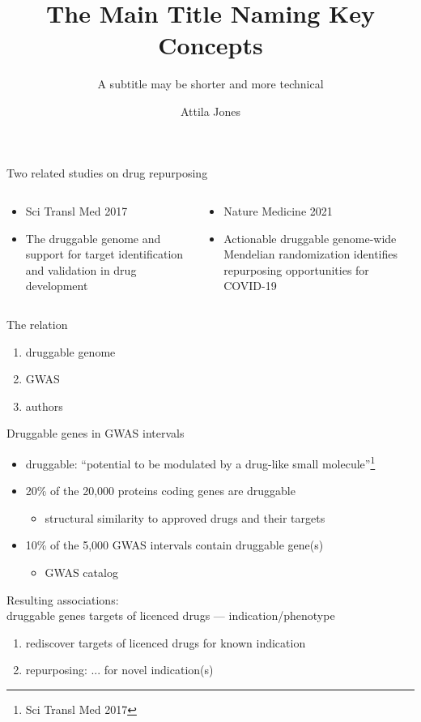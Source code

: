 \documentclass{beamer}
\title{The Main Title Naming Key Concepts}
\subtitle{A subtitle may be shorter and more technical}
\author{Attila Jones}
\date{}
\begin{document}
\begin{frame}{Two related studies on drug repurposing}
\begin{columns}[t]
\begin{column}{0.5\textwidth}
\begin{itemize}
\item Sci Transl Med 2017
\item {\footnotesize The druggable genome and support for target identification and
	validation in drug development}
\end{itemize}
\end{column}

\begin{column}{0.5\textwidth}
\begin{itemize}
\item Nature Medicine 2021
\item {\footnotesize Actionable druggable genome-wide Mendelian randomization
	identifies repurposing opportunities for COVID-19}
\end{itemize}
\end{column}
\end{columns}
\begin{center}
The relation
\begin{enumerate}
\item druggable genome
\item GWAS
\item authors
\end{enumerate}
\end{center}
\end{frame}

\begin{frame}{Druggable genes in GWAS intervals}
\begin{itemize}
\item druggable: ``potential to be modulated by a drug-like small
	molecule''\footnote{Sci Transl Med 2017}
\item 20\% of the 20,000 proteins coding genes are druggable
\begin{itemize}
\item structural similarity to approved drugs and their targets
\end{itemize}
\item 10\% of the 5,000 GWAS intervals contain druggable gene(s)
\begin{itemize}
\item GWAS catalog
\end{itemize}
\end{itemize}

\vfill
Resulting associations:\\
druggable genes targets of licenced drugs --- indication/phenotype
\begin{enumerate}
\item rediscover targets of licenced drugs for known indication
\item repurposing: ... for novel indication(s)
\end{enumerate}
\end{frame}
\end{document}
